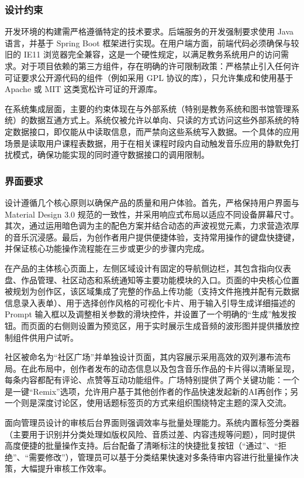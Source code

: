 \documentclass{base}
\numberwithin{figure}{section} %
\begin{document}
\subsubsection{设计约束}

开发环境的构建需严格遵循特定的技术要求。后端服务的开发强制要求使用 Java 语言，并基于 Spring Boot 框架进行实现。在用户端方面，前端代码必须确保与较旧的 IE11 浏览器完全兼容，这是一个硬性规定，以满足教务系统用户的访问需求。对于项目依赖的第三方组件，存在明确的许可限制政策：严格禁止引入任何许可证要求公开源代码的组件（例如采用 GPL 协议的库），只允许集成和使用基于 Apache 或 MIT 这类宽松许可证的开源库。

在系统集成层面，主要的约束体现在与外部系统（特别是教务系统和图书馆管理系统）的数据互通方式上。系统仅被允许以单向、只读的方式访问这些外部系统的特定数据接口，即仅能从中读取信息，而严禁向这些系统写入数据。一个具体的应用场景是读取用户课程表数据，用于在相关课程时段内自动触发音乐应用的静默免打扰模式，确保功能实现的同时遵守数据接口的调用限制。

\subsubsection{界面要求}

设计遵循几个核心原则以确保产品的质量和用户体验。首先，严格保持用户界面与 Material Design 3.0 规范的一致性，并采用响应式布局以适应不同设备屏幕尺寸。其次，通过运用暗色调为主的配色方案并结合动态的声波视觉元素，力求营造浓厚的音乐沉浸感。最后，为创作者用户提供便捷体验，支持常用操作的键盘快捷键，并保证核心功能操作流程能在三步或更少的步骤内完成。

在产品的主体核心页面上，左侧区域设计有固定的导航侧边栏，其包含指向仪表盘、作品管理、社区动态和系统通知等主要功能模块的入口。页面的中央核心位置被规划为创作区，该区域集成了完整的作品上传功能（支持文件拖拽并配有元数据信息录入表单）、用于选择创作风格的可视化卡片、用于输入引导生成详细描述的 Prompt 输入框以及调整相关参数的滑块控件，并设置了一个明确的“生成”触发按钮。而页面的右侧则设置为预览区，用于实时展示生成音频的波形图并提供播放控制组件供用户试听。

社区被命名为“社区广场”并单独设计页面，其内容展示采用高效的双列瀑布流布局。在此布局中，创作者发布的动态信息以及包含音乐作品的卡片得以清晰呈现，每条内容都配有评论、点赞等互动功能组件。广场特别提供了两个关键功能：一个是一键“Remix”选项，允许用户基于其他创作者的作品快速发起新的AI再创作；另一个则是深度讨论区，使用话题标签页的方式来组织围绕特定主题的深入交流。

面向管理员设计的审核后台界面则强调效率与批量处理能力。系统内置标签分类器（主要用于识别并分类处理如版权风险、音质过差、内容违规等问题），同时提供高度便捷的批量操作支持。后台配备了清晰标注的快捷批复按钮（“通过”、“拒绝”、“需要修改”），管理员可以基于分类结果快速对多条待审内容进行批量操作决策，大幅提升审核工作效率。
\end{document}
